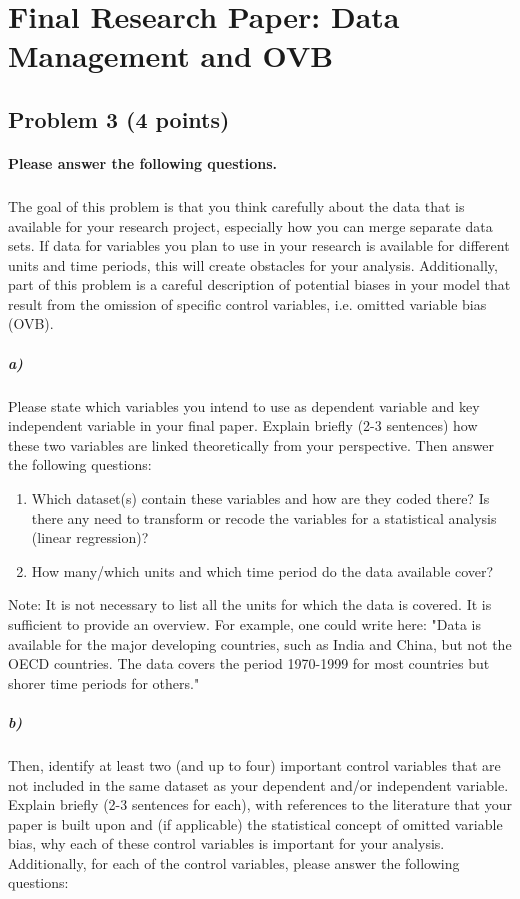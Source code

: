 \documentclass[12pt]{article}
\begin{document}
\section*{Final Research Paper: Data Management and OVB}

\subsection*{Problem 3 (4 points)}

\paragraph{Please answer the following questions.}

\subparagraph{} The goal of this problem is that you think carefully about the data that is available for your research project, especially how you can merge separate data sets. If data for variables you plan to use in your research is available for different units and time periods, this will create obstacles for your analysis. Additionally, part of this problem is a careful description of potential biases in your model that result from the omission of specific control variables, i.e. omitted variable bias (OVB).

\subparagraph{a)} Please state which variables you intend to use as dependent variable and key independent variable in your final paper. Explain briefly (2-3 sentences) how these two variables are linked theoretically from your perspective. Then answer the following questions:

\begin{enumerate}
	\item Which dataset(s) contain these variables and how are they coded there? Is there any need to transform or recode the variables for a statistical analysis (linear regression)?
	\item How many/which units and which time period do the data available cover?
\end{enumerate}

Note: It is not necessary to list all the units for which the data is covered. It is sufficient to provide an overview. For example, one could write here: "Data is available for the major developing countries, such as India and China, but not the OECD countries. The data covers the period 1970-1999 for most countries but shorer time periods for others."

\subparagraph{b)} Then, identify at least two (and up to four) important control variables that are not included in the same dataset as your dependent and/or independent variable. Explain briefly (2-3 sentences for each), with references to the literature that your paper is built upon and (if applicable) the statistical concept of omitted variable bias, why each of these control variables is important for your analysis. Additionally, for each of the control variables, please answer the following questions:
\end{document}
